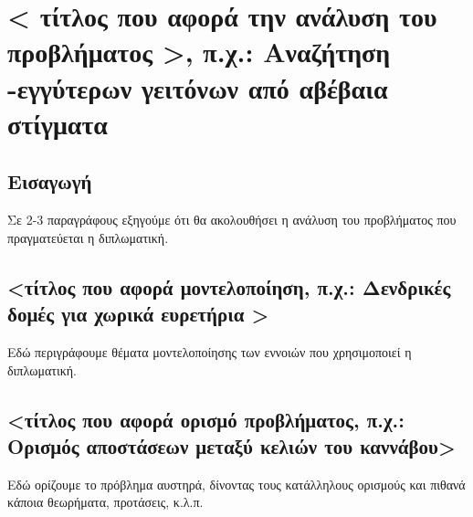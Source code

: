 \chapter{< τίτλος που αφορά την ανάλυση του προβλήματος >, π.χ.: Αναζήτηση -εγγύτερων γειτόνων από αβέβαια στίγματα}
\label{chap4}

\section{Εισαγωγή}

Σε 2-3 παραγράφους εξηγούμε ότι θα ακολουθήσει η ανάλυση του προβλήματος που πραγματεύεται η διπλωματική.

\section{<τίτλος που αφορά μοντελοποίηση, π.χ.: Δενδρικές δομές για χωρικά ευρετήρια >}

Εδώ περιγράφουμε θέματα μοντελοποίησης των εννοιών που χρησιμοποιεί η διπλωματική.

\section{<τίτλος που αφορά ορισμό προβλήματος, π.χ.: Ορισμός αποστάσεων μεταξύ κελιών του καννάβου>}

Εδώ ορίζουμε το πρόβλημα αυστηρά, δίνοντας τους κατάλληλους ορισμούς και πιθανά κάποια θεωρήματα, προτάσεις, κ.λ.π. 



